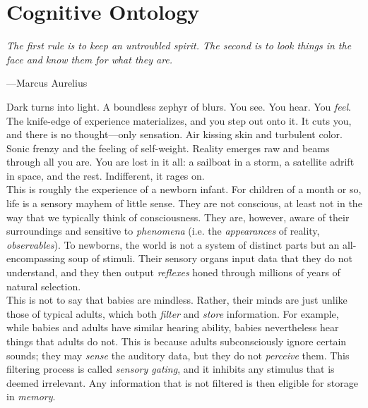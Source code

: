 \chapter{Cognitive Ontology}

\vspace{4mm}
\begin{displayquote}
    \textit{The first rule is to keep an untroubled spirit. The second is to look things in the face and know them for what they are.}
    \vspace{2mm}
    \begin{flushright}
        ---Marcus Aurelius
    \end{flushright}
\end{displayquote}
\vspace{4mm}

Dark turns into light. A boundless zephyr of blurs. You see. You hear. You \textit{feel}. The knife-edge of experience materializes, and you step out onto it. It cuts you, and there is no thought---only sensation. Air kissing skin and turbulent color. Sonic frenzy and the feeling of self-weight. Reality emerges raw and beams through all you are. You are lost in it all: a sailboat in a storm, a satellite adrift in space, and the rest. Indifferent, it rages on. \\

This is roughly the experience of a newborn infant. For children of a month or so, life is a sensory mayhem of little sense. They are not conscious, at least not in the way that we typically think of consciousness. They are, however, aware of their surroundings and sensitive to \textit{phenomena} (i.e. the \textit{appearances} of reality, \textit{observables}). To newborns, the world is not a system of distinct parts but an all-encompassing soup of stimuli. Their sensory organs input data that they do not understand, and they then output \textit{reflexes} honed through millions of years of natural selection. \\

This is not to say that babies are mindless. Rather, their minds are just unlike those of typical adults, which both \textit{filter} and \textit{store} information. For example, while babies and adults have similar hearing ability, babies nevertheless hear things that adults do not. This is because adults subconsciously ignore certain sounds; they may \textit{sense} the auditory data, but they do not \textit{perceive} them. This filtering process is called \textit{sensory gating}, and it inhibits any stimulus that is deemed irrelevant. Any information that is not filtered is then eligible for storage in \textit{memory}. \\

